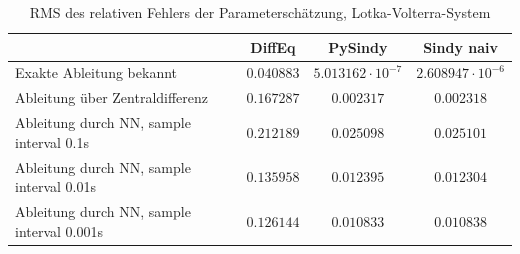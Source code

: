 \documentclass[arbeit=studie,oneside,BCOR=12mm]{ArbeitRST}
\begin{document}
\begin{table}[htbp]

\begin{tabular}[h]{l|c|c|c}
											& DiffEq		& PySindy 			& Sindy naiv		\\\hline
Exakte Ableitung bekannt					& 	$0.040883$		&	$5.013162\cdot10^{-7}$	& 	$2.608947\cdot10^{-6}$	\\\hline
Ableitung über Zentraldifferenz 			& 	$0.167287$		&	$0.002317$			&	$0.002318$			\\\hline
Ableitung durch NN, sample interval 0.1s	& 	$0.212189$		&	$0.025098$			&	$0.025101$			\\\hline
Ableitung durch NN, sample interval 0.01s	& 	$0.135958$		&	$0.012395$			&	$0.012304$			\\\hline
Ableitung durch NN, sample interval 0.001s	& 	$0.126144$		&	$0.010833$			&	$0.010838$			\\
\end{tabular}													 
\caption{RMS des relativen Fehlers der Parameterschätzung, Lotka-Volterra-System}
\end{table}

\\
\\
\\
\\
\\
\\
\\
\end{document}
